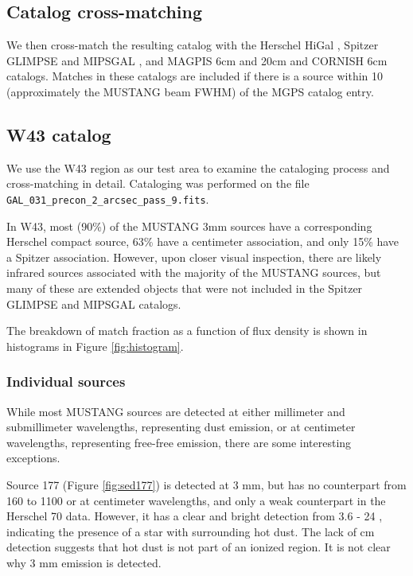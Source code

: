 \documentclass[twocolumn]{aastex62}
\begin{document}
\subsection{Catalog cross-matching}
\label{sec:catalogmatching}
We then cross-match the resulting catalog with the Herschel HiGal
\citep{Elia2017a}, Spitzer GLIMPSE and MIPSGAL
\citep{Churchwell2009a,Gutermuth2015a}, and MAGPIS 6cm and 20cm
\citep{Giveon2005a,Hoare2006a} and CORNISH 6cm \citep{Hoare2012a} catalogs.
Matches in these catalogs are included if there is a source within 10\arcsec
(approximately the MUSTANG beam FWHM) of the MGPS catalog entry.

\subsection{W43 catalog}
We use the W43 region as our test area to examine the cataloging process and
cross-matching in detail.  Cataloging was performed on the file
\texttt{GAL\_031\_precon\_2\_arcsec\_pass\_9.fits}.

In W43, most (90\%) of the MUSTANG 3mm sources have a corresponding Herschel
compact source, 63\% have a centimeter association, and only 15\% have a
Spitzer association.  However, upon closer visual inspection, there are likely
infrared sources associated with the majority of the MUSTANG sources, but many
of these are extended objects that were not included in the Spitzer GLIMPSE and
MIPSGAL catalogs.

The breakdown of match fraction as a function of flux density is shown in histograms
in Figure \ref{fig:histogram}.

\subsubsection{Individual sources}
While most MUSTANG sources are detected at either millimeter and submillimeter
wavelengths, representing dust emission, or at centimeter wavelengths,
representing free-free emission, there are some interesting exceptions.

Source 177 (Figure \ref{fig:sed177}) is detected at 3 mm, but has no counterpart from 160 to 1100 \um or
at centimeter wavelengths, and only a weak counterpart in the Herschel 70 \um
data. However, it has a clear and bright detection from 3.6 - 24 \um, indicating
the presence of a star with surrounding hot dust.  The lack of cm detection suggests
that hot dust is not part of an ionized region.  It is not clear why 3 mm emission
is detected.
\end{document}
